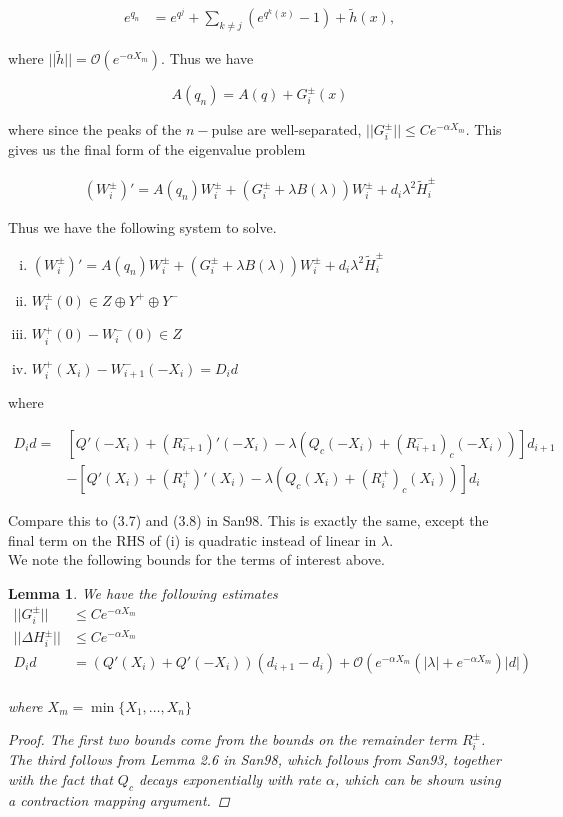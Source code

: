 \documentclass[12pt]{article}
\newtheorem{lemma}{Lemma}
\begin{document}
\begin{align*}
e^{q_n} &= e^{q^j} + \sum_{k \neq j} (e^{q^k(x)} - 1) + \tilde{h}(x),
\end{align*}

where $||\tilde{h}|| = \mathcal{O}(e^{-\alpha X_m})$. Thus we have

\[
A(q_n) = A(q) + G_i^\pm(x)
\]

where since the peaks of the $n-$pulse are well-separated, $||G_i^\pm|| \leq C e^{-\alpha X_m}$. This gives us the final form of the eigenvalue problem

\begin{align}
(W_i^\pm)' = A(q_n) W_i^\pm + (G_i^\pm + \lambda B(\lambda)) W_i^\pm 
+ d_i \lambda^2 \tilde{H}_i^\pm
\end{align}

Thus we have the following system to solve.

\begin{enumerate}[(i)]
\item $(W_i^\pm)' = A(q_n) W_i^\pm + (G_i^\pm + \lambda B(\lambda)) W_i^\pm 
+ d_i \lambda^2 \tilde{H}_i^\pm$
\item $W_i^\pm(0) \in Z \oplus Y^+ \oplus Y^-$
\item $W_i^+(0) - W_i^-(0) \in Z$
\item $W_i^+(X_i) - W_{i+1}^-(-X_i) = D_i d$
\end{enumerate}

where

\begin{align*}
D_i d = &[Q'(-X_i) + (R_{i+1}^-)'(-X_i) - \lambda(Q_c(-X_i) + (R_{i+1}^-)_c(-X_i))]d_{i+1} \\
&- [Q'(X_i) + (R_i^+)'(X_i) - \lambda(Q_c(X_i) + (R_i^+)_c(X_i))]d_i
\end{align*}

Compare this to (3.7) and (3.8) in San98. This is exactly the same, except the final term on the RHS of (i) is quadratic instead of linear in $\lambda$.\\

We note the following bounds for the terms of interest above.

\begin{lemma}\label{problembounds}
We have the following estimates
\begin{align*}
||G_i^\pm|| &\leq C e^{-\alpha X_m} \\
||\Delta H_i^\pm|| &\leq Ce^{-\alpha X_m} \\
D_i d &= (Q'(X_i) + Q'(-X_i))(d_{i+1} - d_i ) + \mathcal{O} \left( e^{-\alpha X_m} \left( |\lambda| +  e^{-\alpha X_m}  \right) |d| \right) \\
\end{align*}

where $X_m = \min\{ X_1, \dots, X_n \}$

\begin{proof}
The first two bounds come from the bounds on the remainder term $R_i^\pm$. The third follows from Lemma 2.6 in San98, which follows from San93, together with the fact that $Q_c$ decays exponentially with rate $\alpha$, which can be shown using a contraction mapping argument.
\end{proof}
\end{lemma}
\end{document}
